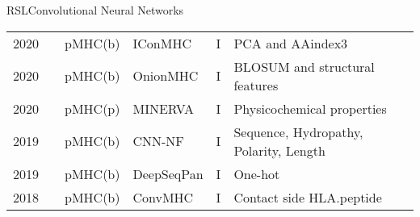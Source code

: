 \documentclass[10pt]{beamer}
\newcommand{\1}{
	\setbeamertemplate{background}{
		\texttt{[image: img/1]}
		\tikz[overlay] \fill[fill opacity=0.75,fill=white] (0,0) rectangle (-\paperwidth,\paperheight);
	}
}
\begin{document}
\begin{frame}{RSL}{Convolutional Neural Networks}
\begin{table}[]
{\begin{tabular}{p{0.6cm}p{0.6cm}p{1.5cm}p{2cm}p{0.6cm}p{2.7cm}}
				2020          & \cite{pei2020iconmhc}     & pMHC(b)      & IConMHC       & I        & PCA and AAindex3        \\
				2020          & \cite{saxena2020onionmhc} & pMHC(b)      & OnionMHC      & I        & BLOSUM and structural features                                                                  \\
				2020          & \cite{ng3704016minerva}   & pMHC(p) & MINERVA       & I        & Physicochemical properties                                                           \\
				2019          & \cite{zhao2019peptide}    & pMHC(b)      & CNN-NF        & I        & Sequence, Hydropathy, Polarity, Length                    \\
				2019          & \cite{liu2019deepseqpan}  & pMHC(b)      & DeepSeqPan    & I        & One-hot                                          \\
				2018          & \cite{han2018deep}        & pMHC(b)      & ConvMHC       & I        & Contact side HLA.peptide                                                                                 
			\end{tabular}
		}
		\end{table}	
\end{frame}
\end{document}
